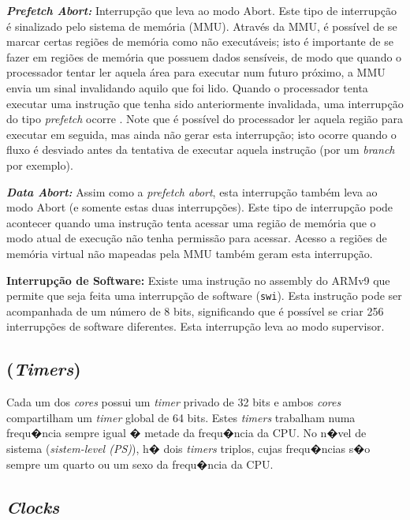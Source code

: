 \documentclass{ufscThesis/ufscThesis} %
\begin{document}
\textbf{\emph{Prefetch Abort: }} Interrupção que leva ao modo Abort. Este tipo de interrupção é sinalizado pelo sistema de memória (MMU). Através da MMU, é possível de se marcar certas regiões de memória como não executáveis; isto é importante de se fazer em regiões de memória que possuem dados sensíveis, de modo que quando o processador tentar ler aquela área para executar num futuro próximo, a MMU envia um sinal invalidando aquilo que foi lido. Quando o processador tenta executar uma instrução que tenha sido anteriormente invalidada, uma interrupção do tipo \emph{prefetch} ocorre \cite[p.~58]{armarm}. Note que é possível do processador ler aquela região para executar em seguida, mas ainda não gerar esta interrupção; isto ocorre quando o fluxo é desviado antes da tentativa de executar aquela instrução (por um \emph{branch} por exemplo).

\textbf{\emph{Data Abort:}} Assim como a \emph{prefetch abort}, esta interrupção também leva ao modo Abort (e somente estas duas interrupções). Este tipo de interrupção pode acontecer quando uma instrução tenta acessar uma região de memória que o modo atual de execução não tenha permissão para acessar. Acesso a regiões de memória virtual não mapeadas pela MMU também geram esta interrupção.


\textbf{Interrupção de Software: } Existe uma instrução no assembly do ARMv9 que permite que seja feita uma interrupção de software (\verb+swi+). Esta instrução pode ser acompanhada de um número de 8 bits, significando que é possível se criar 256 interrupções de software diferentes. Esta interrupção leva ao modo supervisor.

\subsection{(\emph{Timers})}
Cada um dos \emph{cores} possui um \emph{timer} privado de 32 bits e ambos \emph{cores} compartilham um \emph{timer} global de 64 bits. Estes \emph{timers} trabalham numa frequ�ncia sempre igual � metade da frequ�ncia da CPU.
No n�vel de sistema (\emph{sistem-level (PS)}), h� dois \emph{timers} triplos, cujas frequ�ncias s�o sempre um quarto ou um sexo da frequ�ncia da CPU.




\subsection{\emph{Clocks}}
\end{document}
